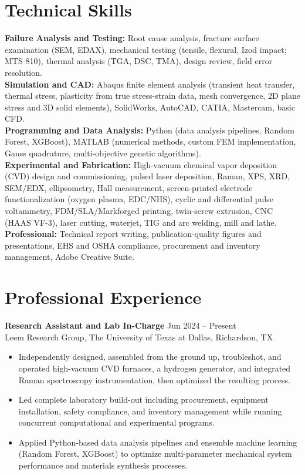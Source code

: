 \documentclass[11pt, letterpaper]{article}
\newcommand{\role}[2]{\textbf{#1} \hfill #2 \\}
\begin{document}
\section{Technical Skills}
\textbf{Failure Analysis and Testing:} Root cause analysis, fracture surface examination (SEM, EDAX), mechanical
testing (tensile, flexural, Izod impact; MTS 810), thermal analysis (TGA, DSC, TMA), design review, field error
resolution. \\
\textbf{Simulation and CAD:} Abaqus finite element analysis (transient heat transfer, thermal stress, plasticity from true stress-strain
data, mesh convergence, 2D plane stress and 3D solid elements), SolidWorks, AutoCAD, CATIA, Mastercam, basic CFD. \\
\textbf{Programming and Data Analysis:} Python (data analysis pipelines, Random Forest, XGBoost), MATLAB
(numerical methods, custom FEM implementation, Gauss quadrature, multi-objective genetic algorithms). \\
\textbf{Experimental and Fabrication:} High-vacuum chemical vapor deposition (CVD) design and commissioning, pulsed laser deposition, Raman,
XPS, XRD, SEM/EDX, ellipsometry, Hall measurement, screen-printed electrode functionalization (oxygen plasma,
EDC/NHS), cyclic and differential pulse voltammetry, FDM/SLA/Markforged printing, twin-screw extrusion, CNC
(HAAS VF-3), laser cutting, waterjet, TIG and arc welding, mill and lathe. \\
\textbf{Professional:} Technical report writing, publication-quality figures and presentations, EHS and OSHA
compliance, procurement and inventory management, Adobe Creative Suite.

\section{Professional Experience}

\role{Research Assistant and Lab In-Charge}{Jun 2024 -- Present}
Leem Research Group, The University of Texas at Dallas, Richardson, TX
\begin{itemize}
    \item Independently designed, assembled from the ground up, troubleshot, and operated high-vacuum CVD furnaces, a hydrogen generator, and integrated Raman spectroscopy instrumentation, then optimized the resulting process.
    \item Led complete laboratory build-out including procurement, equipment installation, safety compliance, and inventory management while running concurrent computational and experimental programs.
    \item Applied Python-based data analysis pipelines and ensemble machine learning (Random Forest, XGBoost) to optimize multi-parameter mechanical system performance and materials synthesis processes.
\end{itemize}
\end{document}
